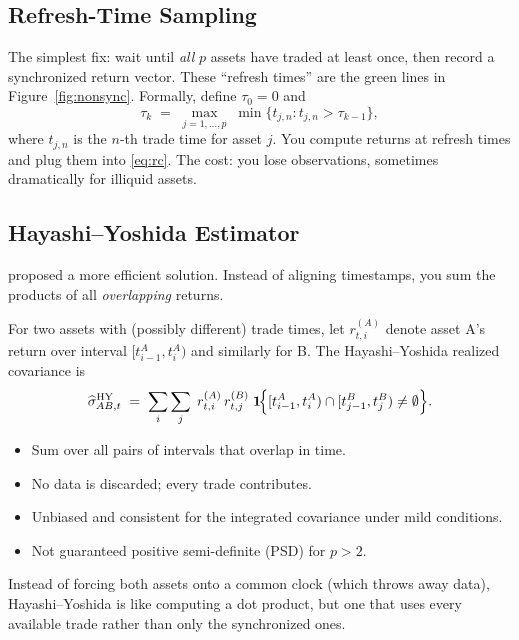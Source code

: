 \subsection{Refresh-Time Sampling}

The simplest fix: wait until \emph{all} $p$ assets have traded at least once,
then record a synchronized return vector. These ``refresh times'' are the green
lines in Figure~\ref{fig:nonsync}. Formally, define $\tau_0 = 0$ and
\[
  \tau_k \;=\; \max_{j=1,\ldots,p}\; \min\bigl\{t_{j,n} : t_{j,n} > \tau_{k-1}\bigr\},
\]
where $t_{j,n}$ is the $n$-th trade time for asset $j$. You compute returns at
refresh times and plug them into \eqref{eq:rc}. The cost: you lose observations,
sometimes dramatically for illiquid assets.

\subsection{Hayashi--Yoshida Estimator}

\citet{HayashiYoshida2005} proposed a more efficient solution. Instead of aligning
timestamps, you sum the products of all \emph{overlapping} returns.

\begin{definition}
For two assets with (possibly different) trade times, let $r_{t,i}^{(A)}$ denote
asset A's return over interval $[t_{i-1}^A, t_i^A)$ and similarly for B. The
Hayashi--Yoshida realized covariance is
\begin{equation}\label{eq:hy}
  \widehat{\sigma}_{AB,t}^{\mathrm{HY}}
  \;=\; \sum_{i}\sum_{j}\; r_{t,i}^{(A)}\, r_{t,j}^{(B)}\;
  \mathbf{1}\!\Bigl\{
    [t_{i-1}^A, t_i^A) \cap [t_{j-1}^B, t_j^B) \neq \emptyset
  \Bigr\}.
\end{equation}
\begin{itemize}[nosep]
  \item Sum over all pairs of intervals that overlap in time.
  \item No data is discarded; every trade contributes.
  \item Unbiased and consistent for the integrated covariance under mild conditions.
  \item Not guaranteed positive semi-definite (PSD) for $p > 2$.
\end{itemize}
\end{definition}

\begin{intuition}
Instead of forcing both assets onto a common clock (which throws away data),
Hayashi--Yoshida is like computing a dot product, but one that uses every
available trade rather than only the synchronized ones.
\end{intuition}

